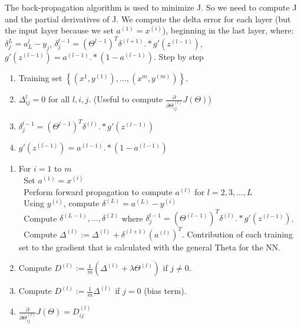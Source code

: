 \documentclass[12pt,a4paper]{report}
\begin{document}
	The back-propagation algorithm is used to minimize J. So we need to compute J and the partial derivatives of J.
	We compute the delta error for each layer (but the input layer because we set $a^{(1)} = x^{(i)}$), beginning in the last layer, where: $\delta_{j}^{L} = a_{L}^{l}-y_{j}$, $\delta_{j}^{l-1} = (\Theta^{l-1}) ^{T}\delta^{(l+1)}.*g'(z^{(l-1)})$, $g'(z^{(l-1)}) = a^{(l-1)}.*(1-a^{(l-1)}) $. Step by step
	\begin{enumerate}
	\item Training set $\left\lbrace  (x^{1},y^{(1)}), ..., (x^{m},y^{(m)})\right\rbrace $.
	
	\item $\Delta_{ij}^{l} = 0$ for all $l,i,j$. (Useful to compute $\frac{\partial}{\partial \Theta^{(l)}_{ij}} J(\Theta)$)
	
	\item $\delta_{j}^{l-1} = (\Theta^{l-1}) ^{T}\delta^{(l)}.*g'(z^{(l-1)})$
	
	\item $g'(z^{(l-1)}) = a^{(l-1)}.*(1-a^{(l-1)}) $ 
	\end{enumerate}
	\begin{enumerate}
	\item For $i = 1$ to $m$\hspace{10mm}\\
	\textcolor{white}{.} \hspace{10mm}	 Set $a^{(1)} = x^{(i)}$\\
	\textcolor{white}{.} \hspace{10mm} Perform forward propagation to compute $a^{(l)}$ for $l = 2, 3, ..., L$\\
	\textcolor{white}{.} \hspace{10mm} Using $y^{(i)}$, compute  $\delta^{(L)} = a^{(L)}-y^{(i)}$\\
	\textcolor{white}{.} \hspace{10mm} Compute $\delta^{(L-1)},..., \delta^{(2)}$ where $\delta_{j}^{l-1} = (\Theta^{(l-1)}) ^{T}\delta^{(l)}.*g'(z^{(l-1)})$.\\
	\textcolor{white}{.} \hspace{10mm} Compute $\Delta^{(l)}:=\Delta^{(l)}+\delta^{(l+1)}(a^{(l)})^{T}$. Contribution of each training set to the gradient that is calculated with the general Theta for the NN.
	
	\item Compute $D^{(l)}:=\frac{1}{m}(\Delta^{(l)}+\lambda\Theta^{(l)})$ if $j\neq 0$.
	
	\item Compute $D^{(l)}:=\frac{1}{m}\Delta^{(l)}$ if $j = 0$ (bias term).
	
	\item $\frac{\partial}{\partial \Theta^{(l)}_{ij}} J(\Theta) = D^{(l)}_{ij}$
	\end{enumerate}
	
\end{document}

